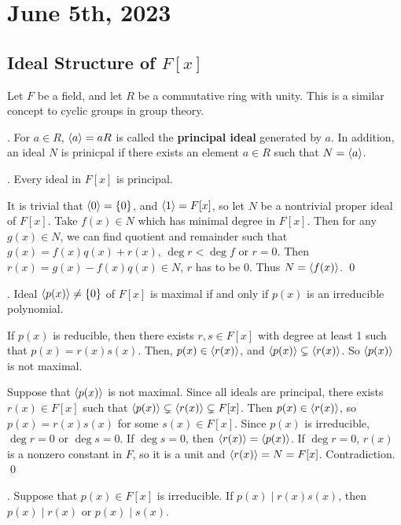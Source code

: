 \section*{June 5th, 2023}

\subsection*{Ideal Structure of \(F[x]\)}

Let \(F\) be a field, and let \(R\) be a commutative ring with unity. This is a similar concept to cyclic groups in group theory.

.  For \(a \in R\), \(\left\langle a \right\rangle = aR\) is called the \textbf{principal ideal} generated by \(a\). In addition, an ideal \(N\) is prinicpal if there exists an element \(a \in R\) such that \(N = \left\langle a \right\rangle\).

\thm. Every ideal in \(F[x]\) is principal.

\pf It is trivial that \(\left\langle 0 \right\rangle = \{0\}\), and \(\left\langle 1 \right\rangle = F[x]\), so let \(N\) be a nontrivial proper ideal of \(F[x]\). Take \(f(x) \in N\) which has minimal degree in \(F[x]\). Then for any \(g(x) \in N\), we can find quotient and remainder such that \(g(x) = f(x)q(x) + r(x)\), \(\deg r < \deg f\) or \(r = 0\). Then \(r(x) = g(x) - f(x)q(x) \in N\), \(r\) has to be \(0\). Thus \(N = \left\langle f(x) \right\rangle\). \qed

\thm. Ideal \(\left\langle p(x) \right\rangle \neq \{0\}\) of \(F[x]\) is maximal if and only if \(p(x)\) is an irreducible polynomial.

\pf \note{\mimp} If \(p(x)\) is reducible, then there exists \(r, s \in F[x]\) with degree at least 1 such that \(p(x) = r(x)s(x)\). Then, \(p(x) \in \left\langle r(x) \right\rangle\), and \(\left\langle p(x) \right\rangle \subsetneq \left\langle r(x) \right\rangle\). So \(\left\langle p(x) \right\rangle\) is not maximal.

\note{\mimpd} Suppose that \(\left\langle p(x) \right\rangle\) is not maximal. Since all ideals are principal, there exists \(r(x) \in F[x]\) such that \(\left\langle p(x) \right\rangle \subsetneq \left\langle r(x) \right\rangle \subsetneq F[x]\). Then \(p(x) \in \left\langle r(x) \right\rangle\), so \(p(x) = r(x)s(x)\) for some \(s(x) \in F[x]\). Since \(p(x)\) is irreducible, \(\deg r = 0\) or \(\deg s = 0\). If \(\deg s = 0\), then \(\left\langle r(x) \right\rangle = \left\langle p(x) \right\rangle\). If \(\deg r = 0\), \(r(x)\) is a nonzero constant in \(F\), so it is a unit and \(\left\langle r(x) \right\rangle = N = F[x]\). Contradiction. \qed

\thm. Suppose that \(p(x) \in F[x]\) is irreducible. If \(p(x) \mid r(x)s(x)\), then \(p(x) \mid r(x)\) or \(p(x) \mid s(x)\).

